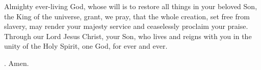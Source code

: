 \lettrine[lines=3]{A}{}lmighty ever-living God, whose will is to restore all things in your beloved Son, the King of the universe, grant, we pray, that the whole creation, set free from slavery, may render your majesty service and ceaselessly proclaim your praise. Through our Lord Jesus Christ, your Son, who lives and reigns with you in the unity of the Holy Spirit, one God, for ever and ever. \par \Rbar. Amen. 